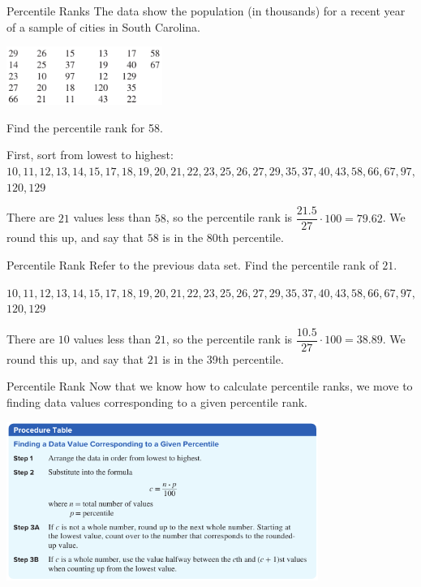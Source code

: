 \documentclass[t, aspectratio=169]{beamer}
\newcommand{\?}{\stackrel{?}{=}}
\begin{document}
	\begin{frame}{Percentile Ranks}
		The data show the population (in thousands) for a recent year of a sample of cities in South Carolina.
		
		\includegraphics[width=2in]{carolina-data.png}
		
		Find the percentile rank for 58. \pause
		
		First, sort from lowest to highest: \\
		$10, 11, 12, 13, 14, 15, 17, 18, 19, 20, 21, 22, 23, 25, 26, 27, 29, 35, 37, 40, 43, 58, 66, 67, 97,$ \\ $120, 129$ \pause
	
		There are $21$ values less than $58$, so the percentile rank is $\dfrac{21.5}{27} \cdot 100 = 79.62$. We round this up, and say that $58$ is in the 80th percentile.
	\end{frame}

	\begin{frame}{Percentile Rank}
		Refer to the previous data set. Find the percentile rank of $21$. \pause
		
		$10, 11, 12, 13, 14, 15, 17, 18, 19, 20, 21, 22, 23, 25, 26, 27, 29, 35, 37, 40, 43, 58, 66, 67, 97,$ \\ $120, 129$ \pause
		
		There are $10$ values less than $21$, so the percentile rank is $\dfrac{10.5}{27} \cdot 100 = 38.89$. We round this up, and say that $21$ is in the 39th percentile. \pause
	\end{frame}

	\begin{frame}{Percentile Rank}
		Now that we know how to calculate percentile ranks, we move to finding data values corresponding to a given percentile rank.
		
		\includegraphics[width=4in]{perc-proc.png}
	\end{frame}
\end{document}

